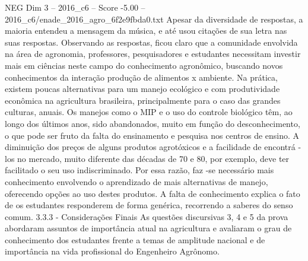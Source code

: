 \begin{textsample}{NEG Dim 3 – 2016\_c6 – Score -5.00 – 2016\_c6/enade\_2016\_agro\_6f2e9fbda0.txt}
Apesar da diversidade de respostas, a maioria entendeu a mensagem da música, e até usou citações de sua letra nas suas respostas.
Observando as respostas, ficou claro que a comunidade envolvida na área de agronomia, professores, pesquisadores e estudantes necessitam investir mais em ciências neste campo do conhecimento agronômico, buscando novos conhecimentos da interação produção de alimentos x ambiente.
Na prática, existem poucas alternativas para um manejo ecológico e com produtividade econômica na agricultura brasileira, principalmente para o caso das grandes culturas, anuais.
Os manejos como o MIP e o uso do controle biológico têm, ao longo dos últimos anos, sido abandonados, muito em função do desconhecimento, o que pode ser fruto da falta do ensinamento e pesquisa nos centros de ensino.
A diminuição dos preços de alguns produtos agrotóxicos e a facilidade de encontrá -los no mercado, muito diferente das décadas de 70 e 80, por exemplo, deve ter facilitado o seu uso indiscriminado.
Por essa razão, faz -se necessário mais conhecimento envolvendo o aprendizado de mais alternativas de manejo, oferecendo opções ao uso destes produtos.
A falta de conhecimento explica o fato de os estudantes responderem de forma genérica, recorrendo a saberes do senso comum. 3.3.3 - Considerações Finais As questões discursivas 3, 4 e 5 da prova abordaram assuntos de importância atual na agricultura e avaliaram o grau de conhecimento dos estudantes frente a temas de amplitude nacional e de importância na vida profissional do Engenheiro Agrônomo.

\end{textsample}
